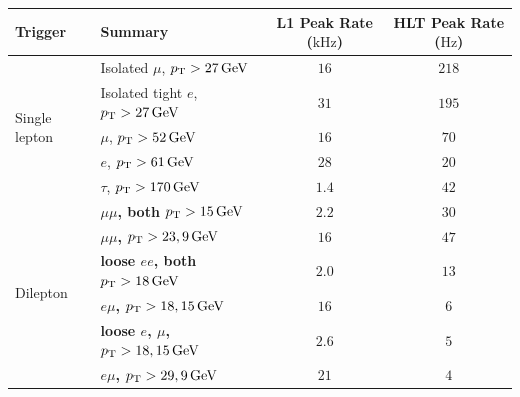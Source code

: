\begin{table}[tp]
\centering
\footnotesize
\begin{adjustbox}{width=\textwidth}
\begin{tabular}{llcc}
Trigger                        & Summary                                                          & L1 Peak Rate ($\mathrm{kHz}$) & HLT Peak Rate ($\mathrm{Hz}$) \\
\hline
\multirow{5}{*}{Single lepton} & Isolated $\mu$, $\pt > 27\,\eV[G]$                               & $16$                          & $218$                         \\
                               & Isolated tight $e$, $\pt > 27\,\eV[G]$                           & $31$                          & $195$                         \\
                               & $\mu$, $\pt > 52\,\eV[G]$                                        & $16$                          & $70$                          \\
                               & $e$, $\pt > 61\,\eV[G]$                                          & $28$                          & $20$                          \\
                               & $\tau$, $\pt > 170\,\eV[G]$                                      & $1.4$                         & $42$                          \\
\hline
\multirow{9}{*}{Dilepton}      & \textbf{$\mu\mu$, both $\pt > 15\,\eV[G]$}                       & \textbf{$2.2$}                & \textbf{$30$}                 \\
                               & \textbf{$\mu\mu$, $\pt > 23, 9\,\eV[G]$}                         & \textbf{$16$}                 & \textbf{$47$}                 \\
                               & \textbf{loose $ee$, both $\pt > 18\,\eV[G]$}                     & \textbf{$2.0$}                & \textbf{$13$}                 \\
                               & \textbf{$e\mu$, $\pt > 18, 15\,\eV[G]$}                          & \textbf{$16$}                 & \textbf{$6$}                  \\
                               & \textbf{loose $e$, $\mu$, $\pt > 18, 15\,\eV[G]$}                & \textbf{$2.6$}                & \textbf{$5$}                  \\
                               & \textbf{$e\mu$, $\pt > 29, 9\,\eV[G]$}                           & \textbf{$21$}                 & \textbf{$4$}                  \\

\end{tabular}
\end{adjustbox}
\end{table}
